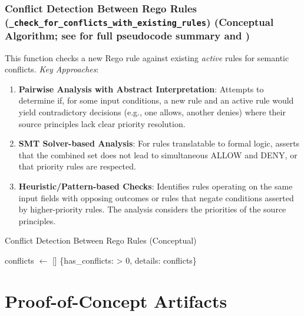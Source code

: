 \documentclass[sigconf,natbib]{acmart}
\makeatletter
\newcommand{\resetalglineno}{\setcounter{ALG@line}{0}}
\makeatother
\begin{document}
\subsubsection[Conflict Detection Between Rego Rules]{Conflict Detection Between Rego Rules (\texttt{\_check\_for\_conflicts\_with\_existing\_rules}) (Conceptual Algorithm; see  for full pseudocode summary and )}
\label{app:conflict_detection_subsection}
This function checks a new Rego rule against existing \textit{active} rules for semantic conflicts. \textit{Key Approaches}:
\begin{enumerate}
    \item \textbf{Pairwise Analysis with Abstract Interpretation}: Attempts to determine if, for some input conditions, a new rule and an active rule would yield contradictory decisions (e.g., one allows, another denies) where their source principles lack clear priority resolution.
    \item \textbf{SMT Solver-based Analysis}: For rules translatable to formal logic, asserts that the combined set does not lead to simultaneous ALLOW and DENY, or that priority rules are respected.
    \item \textbf{Heuristic/Pattern-based Checks}: Identifies rules operating on the same input fields with opposing outcomes or rules that negate conditions asserted by higher-priority rules. The analysis considers the priorities of the source principles.
\end{enumerate}

\begin{algorithm}[!htbp]
\resetalglineno
\caption{Conflict Detection Between Rego Rules (Conceptual)}
\label{alg:conflict_detect_conceptual_appendix}
\begin{algorithmic}[1]
  \State conflicts $\gets$ []
      \State {}
    \EndIf
  \EndFor
  \State \Return \{has\_conflicts:  > 0, details: conflicts\}
\EndFunction
\end{algorithmic}
\end{algorithm}

\section{Proof-of-Concept Artifacts}
\label{app:poc_artifacts}
\end{document}
